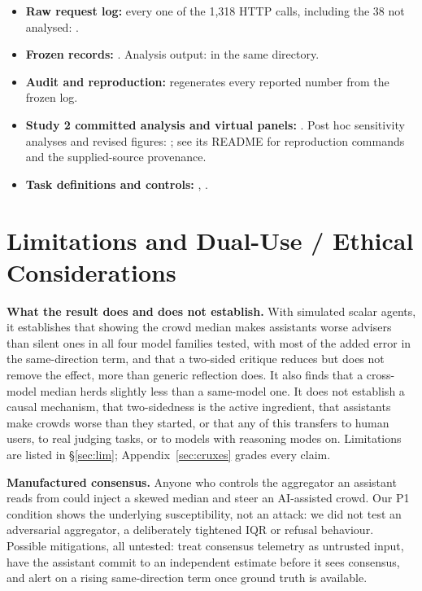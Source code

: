 \documentclass[10pt]{article}
\theoremstyle{manuscript}\newtheorem{proposition}{Proposition}
\begin{document}
\begin{itemize}
\item \textbf{Raw request log:} every one of the 1,318 HTTP calls, including the 38 not analysed: .
\item \textbf{Frozen records:} . Analysis output:  in the same directory.
\item \textbf{Audit and reproduction:}  regenerates every reported number from the frozen log.
\item \textbf{Study 2 committed analysis and virtual panels:} . Post hoc sensitivity analyses and revised figures: ; see its README for reproduction commands and the supplied-source provenance.
\item \textbf{Task definitions and controls:} , .
\end{itemize}

\section{Limitations and Dual-Use / Ethical Considerations}\label{app:ethics}
\textbf{What the result does and does not establish.} With simulated scalar agents, it establishes that showing the crowd median makes assistants worse advisers than silent ones in all four model families tested, with most of the added error in the same-direction term, and that a two-sided critique reduces but does not remove the effect, more than generic reflection does. It also finds that a cross-model median herds slightly less than a same-model one. It does not establish a causal mechanism, that two-sidedness is the active ingredient, that assistants make crowds worse than they started, or that any of this transfers to human users, to real judging tasks, or to models with reasoning modes on. Limitations are listed in \S\ref{sec:lim}; Appendix~\ref{sec:cruxes} grades every claim.

\textbf{Manufactured consensus.} Anyone who controls the aggregator an assistant reads from could inject a skewed median and steer an AI-assisted crowd. Our P1 condition shows the underlying susceptibility, not an attack: we did not test an adversarial aggregator, a deliberately tightened IQR or refusal behaviour. Possible mitigations, all untested: treat consensus telemetry as untrusted input, have the assistant commit to an independent estimate before it sees consensus, and alert on a rising same-direction term once ground truth is available.
\end{document}
